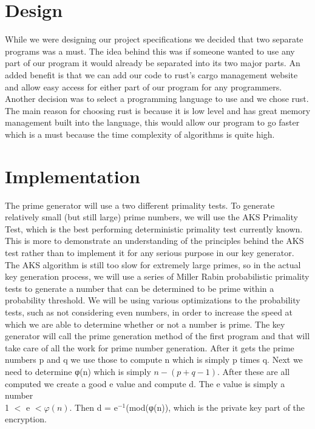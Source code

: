 \documentclass[12pt,journal,compsoc]{IEEEtran}
\begin{document}
\section{Design}
\indent While we were designing our project specifications we decided that two separate programs was a must. The idea behind this was if someone wanted to use any part of our program it would already be separated into its two major parts. An added benefit is that we can add our code to rust's cargo management website and allow easy access for either part of our program for any programmers. 
\newline
\indent Another decision was to select a programming language to use and we chose rust. The main reason for choosing rust is because it is low level and has great memory management built into the language, this would allow our program to go faster which is a must because the time complexity of algorithms is quite high.
\newline \indent


\section{Implementation}
The prime generator will use a two different primality tests. To generate relatively small (but still large) prime numbers, we will use the AKS Primality Test, which is the best performing deterministic primality test currently known. This is more to demonstrate an understanding of the principles behind the AKS test rather than to implement it for any serious purpose in our key generator. The AKS algorithm is still too slow for extremely large primes, so in the actual key generation process, we will use a series of Miller Rabin probabilistic primality tests to generate a number that can be determined to be prime within a probability threshold. We will be using various optimizations to the probability tests, such as not considering even numbers, in order to increase the speed at which we are able to determine whether or not a number is prime.  
\newline \indent The key generator will call the prime generation method of the first program and that will take care of all the work for prime number generation. After it gets the prime numbers p and q we use those to compute n which is simply p times q. Next we need to determine φ(n) which is simply $n - (p + q -1)$. After these are all computed we create a good e value and compute d. The e value is simply a number \\1 $<$ e $<φ(n)$. Then d = e$^{-1}$(mod(φ(n)), which is the private key part of the encryption.
\end{document}
